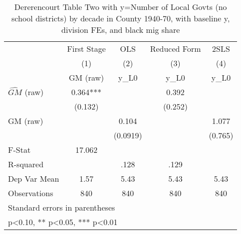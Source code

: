 \begin{table}[htbp]\centering
\def\sym#1{\ifmmode^{#1}\else\(^{#1}\)\fi}
\caption{Dererencourt Table Two with y=Number of Local Govts (no school districts) by decade in County 1940-70, with baseline y, division FEs, and black mig share}
\begin{tabular}{l*{4}{c}}
\toprule
                    & First Stage   &         OLS   &Reduced Form   &        2SLS   \\
                    &\multicolumn{1}{c}{(1)}&\multicolumn{1}{c}{(2)}&\multicolumn{1}{c}{(3)}&\multicolumn{1}{c}{(4)}\\
                    &\multicolumn{1}{c}{GM  (raw)}&\multicolumn{1}{c}{y\_L0}&\multicolumn{1}{c}{y\_L0}&\multicolumn{1}{c}{y\_L0}\\
\midrule
$\hat{GM}$ (raw)    &       0.364***&               &       0.392   &               \\
                    &     (0.132)   &               &     (0.252)   &               \\
\addlinespace
GM  (raw)           &               &       0.104   &               &       1.077   \\
                    &               &    (0.0919)   &               &     (0.765)   \\
\midrule
F-Stat              &      17.062   &               &               &               \\
R-squared           &               &        .128   &        .129   &               \\
Dep Var Mean        &        1.57   &        5.43   &        5.43   &        5.43   \\
Observations        &         840   &         840   &         840   &         840   \\
\bottomrule
\multicolumn{5}{l}{\footnotesize Standard errors in parentheses}\\
\multicolumn{5}{l}{\footnotesize * p<0.10, ** p<0.05, *** p<0.01}\\
\end{tabular}
\end{table}
